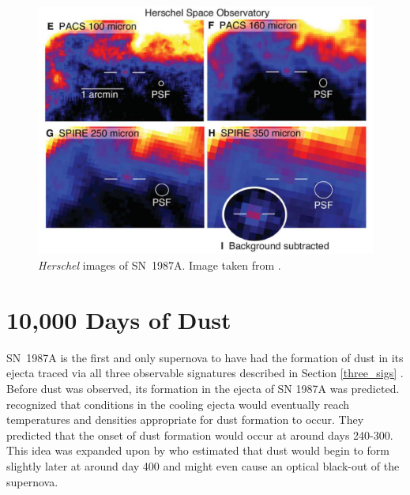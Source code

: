 \begin{figure}
\centering
\includegraphics[clip=true,scale=0.35,trim= 0 0 0 0]{chapters/chapter5/images/Herschel_img.png}
\caption{\textit{Herschel} images of SN~1987A.  Image taken from \citet{Matsuura2011}.}
\label{Herschel_img}
\end{figure}

\section{10,000 Days of Dust}
SN~1987A is the first and only supernova to have had the formation of dust in its ejecta traced via all three observable signatures described in Section \ref{three_sigs} \citep{Bouchet2014}.  Before dust was observed, its formation in the ejecta of SN 1987A was predicted.  \citet{Gehrz1987} recognized that conditions in the cooling ejecta would eventually reach temperatures and densities appropriate for dust formation to occur.  They predicted that the onset of dust formation would occur at around days 240-300.  This idea was expanded upon by \citet{Dwek1988} who estimated that dust would begin to form slightly later at around day 400 and might even cause an optical black-out of the supernova.


